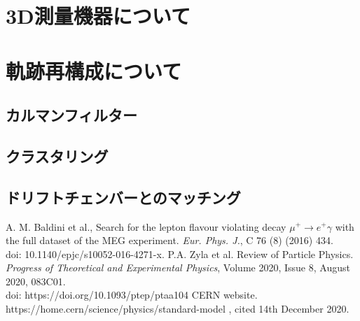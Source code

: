 \documentclass[report]{jsbook}
\begin{document}
\chapter{3D測量機器について}
\chapter{軌跡再構成について}
\section{カルマンフィルター}
\section{クラスタリング}
\section{ドリフトチェンバーとのマッチング}

\begin{thebibliography}{99}
 A. M. Baldini et al., Search for the lepton flavour violating decay $\mu^+ \to e^+ \gamma$ with the full dataset of the MEG experiment. {\it Eur. Phys. J.}, C 76 (8) (2016) 434. \\ 
doi: 10.1140/epjc/s10052-016-4271-x. 
 P.A. Zyla et al. Review of Particle Physics.  {\it Progress of Theoretical and Experimental Physics}, Volume 2020, Issue 8, August 2020, 083C01. \\
doi: https://doi.org/10.1093/ptep/ptaa104
 CERN website. https://home.cern/science/physics/standard-model , cited 14th December 2020.
\end{thebibliography}


\begin{comment}

・図の挿入の仕方
\begin{figure}[h]
\begin{center}
\texttt{[image: ./plot1.pdf]}
\caption{サイン関数のグラフ}
\end{center}
\end{figure}


\begin{verbatim}
#include <iostream>
using namespace std;
int main() {
for(int i = 1; i <= 5; i++) {
cout << "こんにちは" << i << endl;
}
return 0;
}
\end{verbatim}
\verb|\usepackage{ascmac}|して\verb|screen| 環境を使うと，枠がつきます。
\begin{screen}
\begin{verbatim}
#include <iostream>
using namespace std;
int main() {
for(int i = 1; i <= 5; i++) {
cout << "こんにちは" << i << endl;
}
return 0;
}
\end{verbatim}
\end{screen}

\end{comment}
\end{document}
